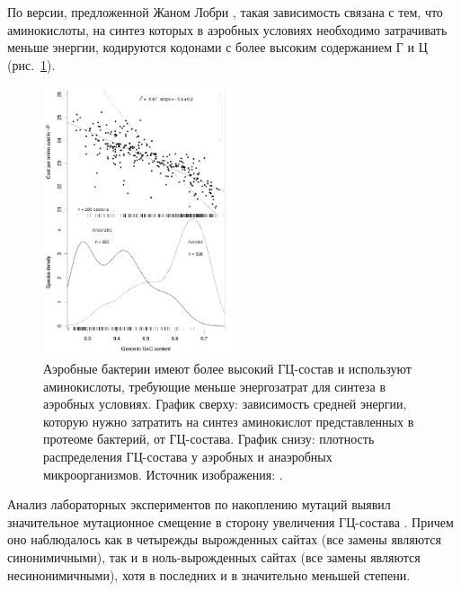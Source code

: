 По версии, предложенной Жаном Лобри \cite{lobry2004life}, такая зависимость связана с тем, что аминокислоты, на синтез которых в аэробных условиях необходимо затрачивать меньше энергии, кодируются кодонами с более высоким содержанием Г и Ц (рис.~\ref{img:gc1}). 

\begin{figure}[!ht] 
  \center
  \includegraphics [width=0.5\textwidth] {Dissertation/images/lit/lit1.png}
  \caption{Аэробные бактерии имеют более высокий ГЦ-состав и используют аминокислоты, требующие меньше энергозатрат для синтеза в аэробных условиях. График сверху: зависимость средней энергии, которую нужно затратить на синтез аминокислот представленных в протеоме бактерий, от ГЦ-состава. График снизу: плотность распределения ГЦ-состава у аэробных и анаэробных микроорганизмов. Источник изображения: \cite{lobry2004life}.} 
  \label{img:gc1}  
\end{figure}

Анализ лабораторных экспериментов по накоплению мутаций выявил значительное мутационное смещение в сторону увеличения ГЦ-состава \cite{long2018evolutionary}. Причем оно наблюдалось как в четырежды вырожденных сайтах (все замены являются синонимичными), так и в ноль-вырожденных сайтах (все замены являются несинонимичными), хотя в последних и в значительно меньшей степени. 

